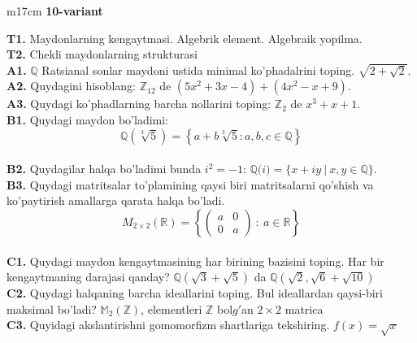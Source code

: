 \documentclass{article}
\begin{document}
\begin{tabular}{m{17cm}}
\textbf{10-variant}
\newline

\textbf{T1.} Maydonlarning kengaytmasi. Algebrik element. Algebraik yopilma. \\
\textbf{T2.} Chekli maydonlarning strukturasi \\
\textbf{A1.} \(\mathbb{Q}\) Ratsianal sonlar maydoni ustida minimal ko'phadalrini toping.
\(\sqrt{2 + \sqrt{2}}\). \\
\textbf{A2.} Quydagini hisoblang:
\(\mathbb{Z}_{12}\) de \(\left( 5x^{2} + 3x - 4 \right) + \left( 4x^{2} - x + 9 \right)\). \\
\textbf{A3.} Quydagi ko'phadlarning barcha nollarini toping:
\(\mathbb{Z}_{2}\) de \(x^{3} + x + 1\). \\
\textbf{B1.} Quydagi maydon bo'ladimi:
\[\mathbb{Q}\left( \sqrt[3]{5} \right) = \left\{ a + b\sqrt[3]{5}:a,b,c \in \mathbb{Q} \right\}\] \\
\textbf{B2.} Quydagilar halqa bo'ladimi bunda \(i^{2} = - 1\):
\(\mathbb{Q(}i) = \{ x + iy\ |\ x,y \in \mathbb{Q\}}\). \\
\textbf{B3.} Quydagi matritsalar to'plamining qaysi biri matritsalarni qo'shish va ko'paytirish amallarga qarata halqa bo'ladi.
\[M_{2 \times 2}\mathbb{(R) =}\left\{ \begin{pmatrix}
a & 0 \\
0 & a
\end{pmatrix}\ :\ a \in \mathbb{R} \right\}\] \\
\textbf{C1.} Quydagi maydon kengaytmasining har birining bazisini toping. Har bir kengaytmaning darajasi qanday?
\(\mathbb{Q}\left( \sqrt{3} + \sqrt{5} \right)\) da \(\mathbb{Q}\left( \sqrt{2},\sqrt{6} + \sqrt{10} \right)\) \\
\textbf{C2.} Quydagi halqaning barcha ideallarini toping. Bul ideallardan qaysi-biri maksimal bo'ladi?
\(\mathbb{M}_{2}\left( \mathbb{Z} \right)\), elementleri \(\mathbb{Z}\) bol\(g'\)an \(2 \times 2\) matrica \\
\textbf{C3.} Quyidagi akslantirishni gomomorfizm shartlariga tekshiring. \(f(x) = \sqrt{x}\) \\

\end{tabular}
\vspace{1cm}
\end{document}
